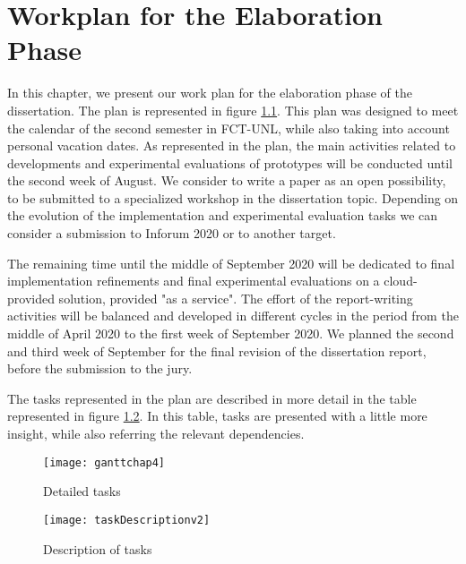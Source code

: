 \chapter{Workplan for the Elaboration Phase}
\label{cha:workplan}



In this chapter, we present our work plan for the elaboration phase of the dissertation. The plan is represented in figure \ref{fig:ganttPlannedTasks}. This plan was designed to meet the calendar of the second semester in FCT-UNL, while also taking into account personal vacation dates. As represented in the plan, the main activities related to developments and experimental evaluations of prototypes will be conducted until the second week of August. 
We consider to write a paper as an open possibility, to be submitted to a specialized workshop in the dissertation topic. Depending on the evolution of the implementation and experimental evaluation tasks we can consider a submission to Inforum 2020 or to another target.

The remaining time until the middle of September 2020 will be dedicated to final implementation refinements and final experimental evaluations on a cloud-provided solution, provided "as a service". The effort of the report-writing activities will be balanced and developed in different cycles in the period from the middle of April 2020 to the first week of September 2020. We planned the second and third week of September for the final revision of the dissertation report, before the submission to the jury. 

The tasks represented in the plan are described in more detail in the table represented in figure \ref{fig:taskDescription}. In this table, tasks are presented with a little more insight, while also referring the relevant dependencies.

\newpage

\begin{figure}[htbp]
	\centerline{\texttt{[image: ganttchap4]}}
	\caption{Detailed tasks}
	\label{fig:ganttPlannedTasks}
\end{figure}

\newpage

\begin{figure}[htbp]
	\centerline{\texttt{[image: taskDescriptionv2]}}
	\caption{Description of tasks}
	\label{fig:taskDescription}
\end{figure}


